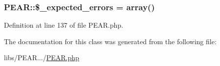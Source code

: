 \subsubsection[{\texorpdfstring{\$\+\_\+expected\+\_\+errors}{$_expected_errors}}]{\setlength{\rightskip}{0pt plus 5cm}P\+E\+A\+R\+::\$\+\_\+expected\+\_\+errors = array()}\hypertarget{classPEAR_ae20c719eaa8316ed0bd6cc83eaa6d0ac}{}\label{classPEAR_ae20c719eaa8316ed0bd6cc83eaa6d0ac}


Definition at line 137 of file P\+E\+A\+R.\+php.



The documentation for this class was generated from the following file\+:\begin{DoxyCompactItemize}
\item 
libs/\+P\+E\+A\+R.../\hyperlink{PEAR_8php}{P\+E\+A\+R.\+php}\end{DoxyCompactItemize}
